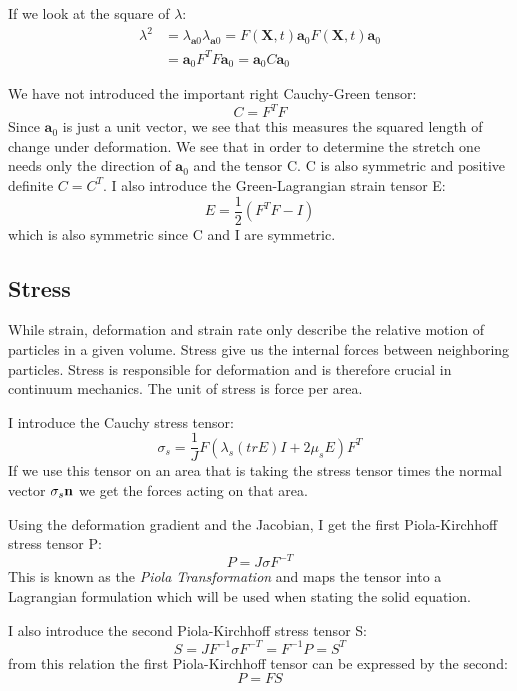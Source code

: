 If we look at the square of $\lambda$:
\begin{align}
\lambda^2 &=  \lambda_{\textbf{a}0} \lambda_{\textbf{a}0} = F(\textbf{X},t)\textbf{a}_0 F(\textbf{X},t)\textbf{a}_0 \\
&= \textbf{a}_0 F^TF\textbf{a}_0 = \textbf{a}_0 C \textbf{a}_0
\end{align}

We have not introduced the important right Cauchy-Green tensor:
 \begin{equation}
 C = F^TF
\end{equation}
Since $\textbf{a}_0 $ is just a unit vector, we see that this measures the squared length of change under deformation. We see that in order to determine the stretch one needs only the direction of $\textbf{a}_0$ and the tensor C.
C is also symmetric and positive definite $C = C^T$.  I also introduce the Green-Lagrangian strain tensor E:
\begin{equation}\label{eq:StrainTensor}
E = \frac{1}{2}(F^TF -I) 
\end{equation}
which is also symmetric since C and I are symmetric. 
		
\subsection{Stress}
While strain, deformation and strain rate only describe the relative motion of particles in a given volume. Stress give us the internal forces between neighboring particles. Stress is responsible for deformation and is therefore crucial in continuum mechanics. The unit of stress is force per area.

I introduce the Cauchy stress tensor:
\begin{equation}
 \sigma_s = \frac{1}{J} F(\lambda_s (tr E)I + 2\mu_sE) F^T
\end{equation}
If we use this tensor on an area that is taking the stress tensor times the normal vector $\sigma_s \bold{n}$ we get the forces acting on that area.

Using the deformation gradient and the Jacobian, I get the first Piola-Kirchhoff stress tensor P:
\begin{equation}
 P = J \sigma F^{-T} 
\end{equation}
This is known as the \textit{Piola Transformation} and maps the tensor into a Lagrangian formulation which will be used when stating the solid equation.

I also introduce the second Piola-Kirchhoff stress tensor S:
\begin{equation}
S = J F^{-1}\sigma F^{-T} = F^{-1} P = S^T 
\end{equation}
from this relation the first Piola-Kirchhoff tensor can be expressed by the second:
\begin{equation}
P = FS
\end{equation}

